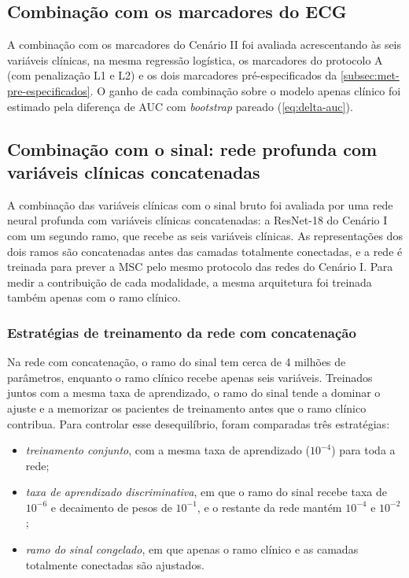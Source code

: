\subsection{Combinação com os marcadores do ECG}
\label{subsec:met-clinicas-marcadores}

A combinação com os marcadores do Cenário II foi avaliada acrescentando às
seis variáveis clínicas, na mesma regressão logística, os marcadores do
protocolo A (com penalização L1 e L2) e os dois marcadores pré-especificados
da \autoref{subsec:met-pre-especificados}. O ganho de cada combinação sobre
o modelo apenas clínico foi estimado pela diferença de \gls{AUC} com
\textit{bootstrap} pareado (\autoref{eq:delta-auc}).

\subsection{Combinação com o sinal: rede profunda com variáveis clínicas concatenadas}
\label{subsec:met-fusao-arquitetura}

A combinação das variáveis clínicas com o sinal bruto foi avaliada por uma rede neural profunda com variáveis clínicas concatenadas: a ResNet-18 do Cenário I com um segundo ramo, que recebe as
seis variáveis clínicas. As representações dos dois ramos são concatenadas
antes das camadas totalmente conectadas, e a rede é treinada para prever a \gls{MSC} pelo
mesmo protocolo das redes do Cenário I. Para medir a contribuição de cada
modalidade, a mesma arquitetura foi treinada também apenas com o ramo
clínico.

\subsubsection{Estratégias de treinamento da rede com concatenação}
\label{subsec:met-fusao}

Na rede com concatenação, o ramo do sinal tem cerca de 4 milhões de parâmetros,
enquanto o ramo clínico recebe apenas seis variáveis. Treinados juntos com a
mesma taxa de aprendizado, o ramo do sinal tende a dominar o ajuste e a
memorizar os pacientes de treinamento antes que o ramo clínico contribua.
Para controlar esse desequilíbrio, foram comparadas três estratégias:

\begin{itemize}
	\item \textit{treinamento conjunto}, com a mesma taxa de aprendizado
	      ($10^{-4}$) para toda a rede;
	\item \textit{taxa de aprendizado discriminativa}, em que o ramo do sinal
	      recebe taxa de $10^{-6}$ e decaimento de pesos de $10^{-1}$, e o restante
	      da rede mantém $10^{-4}$ e $10^{-2}$;
	\item \textit{ramo do sinal congelado}, em que apenas o ramo clínico e as
	      camadas totalmente conectadas são ajustados.
\end{itemize}



